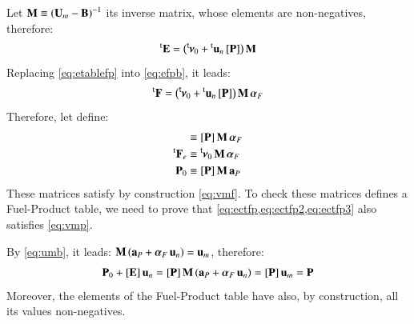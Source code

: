 \documentclass{ecos2018}
\begin{document}
Let ${\mathbf{M} \equiv \left(\mathbf{U}_m - \mathbf{B}\right)^{-1}}$ its inverse matrix, whose elements are non-negatives, therefore:
\begin{equation}
\label{eq:etablefp}
\prescript{\smash{\mathrm{t}}}{}{\mathbf{E}}=\left(\prescript{\smash{\mathsf{t}}}{}{\mskip-1mu}\bm{\nu}_0 +\prescript{\smash{\mathrm{t}}}{}{\mathbf{u}}_n\, [\mathbf{P}]\right)\mathbf{M}
\end{equation}
Replacing \cref{eq:etablefp} into \cref{eq:efpb}, it leads:
\begin{equation}
\prescript{\smash{\mathrm{t}}}{}{\mathbf{F}}=\left(\prescript{\smash{\mathsf{t}}}{}{\mskip-1mu}\bm{\nu}_0 +\prescript{\smash{\mathrm{t}}}{}{\mathbf{u}}_n\, [\mathbf{P}]\right)\mathbf{M}\,\bm{\alpha}_F
\end{equation}
Therefore, let define:
\begin{align}
[\vm{E}] &\equiv [\vm{P}]\, \vm{M}\,\bm{\alpha}_F \label{eq:ectfp}\\
\tvm{F}_e &\equiv \tm\bm{\nu}_0\,\vm{M}\,\bm{\alpha}_F \label{eq:ectfp2}\\ 
\vm{P}_0 &\equiv [\vm{P}]\, \vm{M}\,\vm{a}_P \label{eq:ectfp3}
\end{align}
These matrices satisfy by construction \cref{eq:vmf}. To check these matrices defines a Fuel-Product table, we need to prove that \cref{eq:ectfp,eq:ectfp2,eq:ectfp3} also satisfies \cref{eq:vmp}.

By \cref{eq:umb}, it leads: $\mathbf{M}\left(\mathbf{a}_P+\bm{\alpha}_F\,\mathbf{u}_n\right)=\mathbf{u}_m$, therefore:
\begin{equation}
\mathbf{P}_0+\left[ \textbf{E} \right]\mathbf{u}_n=\left[ \textbf{P} \right]\mathbf{M}\left(\mathbf{a}_P+\bm{\alpha}_F\,\mathbf{u}_n\right)=\left[ \textbf{P} \right]\mathbf{u}_m=\mathbf{P}
\end{equation}
Moreover, the elements of the Fuel-Product table have also, by construction, all its values non-negatives. 
\end{document}
